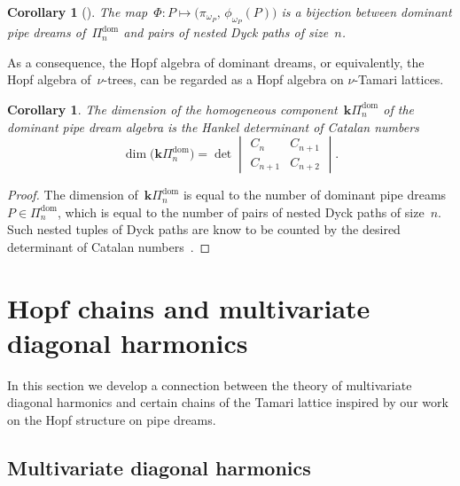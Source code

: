 \documentclass{amsart}
\newtheorem{corollary}[theorem]{Corollary}
\theoremstyle{definition}
\newcommand{\bk}{\mathbf{k}} %
\newcommand{\pipeDreams}{\Pi} %
\newcommand{\pipeDreamsDom}{\pipeDreams^{\operatorname{dom}}} %
\newcommand{\HPdom}{\bk\pipeDreamsDom} %
\begin{document}
\begin{corollary}[{\cite{SerranoStump, CeballosPadrolSarmiento-nuTamariSubwordComplexes}}]
\label{cor:dominantPairsDyckPaths}
The map~$\Phi : P \mapsto \big( \pi_{\omega_P}, \, \phi_{\omega_P}(P) \big)$ is a bijection between dominant pipe dreams of~$\pipeDreamsDom_n$ and pairs of nested Dyck paths of size~$n$.
\end{corollary}

As a consequence, the Hopf algebra of dominant dreams, or equivalently, the Hopf algebra of~$\nu$-trees, can be regarded as a Hopf algebra on $\nu$-Tamari lattices.

\begin{corollary}
The dimension of the homogeneous component~$\HPdom_n$ of the dominant pipe dream algebra is the Hankel determinant of Catalan numbers
\[
\dim \big( \HPdom_n \big) = \det 
\begin{vmatrix} 
C_n & C_{n+1} \\
C_{n+1} & C_{n+2}
\end{vmatrix}.
\]
\end{corollary}

\begin{proof}
The dimension of~$\HPdom_n$ is equal to the number of dominant pipe dreams~$P\in \pipeDreamsDom_n$, which is equal to the number of pairs of nested Dyck paths of size~$n$. Such nested tuples of Dyck paths are know to be counted by the desired determinant of Catalan numbers~\cite{GesselViennot}. 
\end{proof}


\section{Hopf chains and multivariate diagonal harmonics}
\label{sec:multivariateDiagonalHarmonics}

In this section we develop a connection between the theory of multivariate diagonal harmonics and certain chains of the Tamari lattice inspired by our work on the Hopf structure on pipe dreams.


\subsection{Multivariate diagonal harmonics}
\label{subsec:definitionsMultivariateDiagonalHarmonics}
\end{document}
